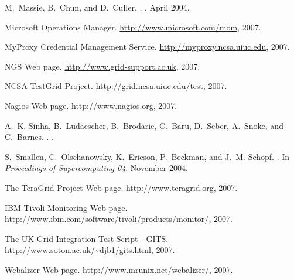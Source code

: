 \documentclass{sig-alternate}
\begin{document}
\begin{thebibliography}{10}
M.~Massie, B.~Chun, and D.~Culler.
.
, April 2004.

{Microsoft Operations Manager}.
\newblock \url{http://www.microsoft.com/mom}, 2007.

{MyProxy Credential Management Service}.
\newblock \url{http://myproxy.ncsa.uiuc.edu}, 2007.

{NGS Web page}.
\newblock \url{http://www.grid-support.ac.uk}, 2007.

{NCSA TestGrid Project}.
\newblock \url{http://grid.ncsa.uiuc.edu/test}, 2007.

{Nagios Web page}.
\newblock \url{http://www.nagios.org}, 2007.

A.~K. Sinha, B.~Ludaescher, B.~Brodaric, C.~Baru, D.~Seber, A.~Snoke, and
  C.~Barnes.
.
.

S.~Smallen, C.~Olschanowsky, K.~Ericson, P.~Beckman, and J.~M. Schopf.
.
\newblock In {\em Proceedings of Supercomputing 04}, November 2004.

{The TeraGrid Project Web page}.
\newblock \url{http://www.teragrid.org}, 2007.

{IBM Tivoli Monitoring Web page}.
\newblock \url{http://www.ibm.com/software/tivoli/products/monitor/}, 2007.

{The UK Grid Integration Test Script - GITS}.
\newblock \url{http://www.soton.ac.uk/~djb1/gits.html}, 2007.

{Webalizer Web page}.
\newblock \url{http://www.mrunix.net/webalizer/}, 2007.

\end{thebibliography}
\end{document}

